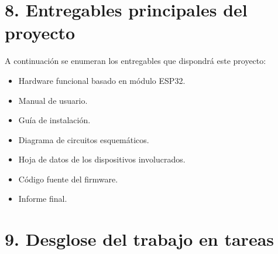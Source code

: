 \documentclass[
11pt, %
]{charter}
\begin{document}
\section{8. Entregables principales del proyecto}
\label{sec:entregables}

A continuación se enumeran los entregables que dispondrá este proyecto:
\begin{itemize}
	\item Hardware funcional basado en módulo ESP32.
	\item Manual de usuario.
	\item Guía de instalación.
	\item Diagrama de circuitos esquemáticos.
	\item Hoja de datos de los dispositivos involucrados.
	\item Código fuente del firmware.
	\item Informe final.

\end{itemize}

\section{9. Desglose del trabajo en tareas}
\label{sec:wbs}
\end{document}
